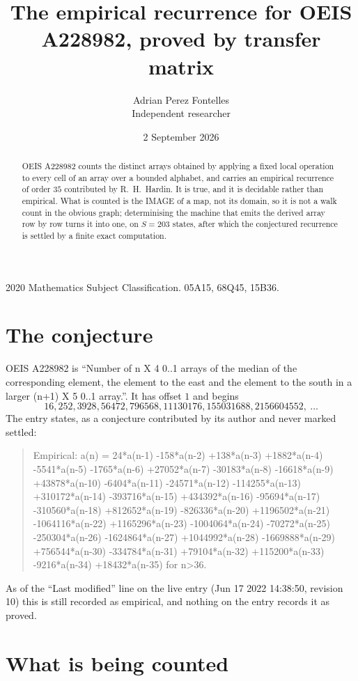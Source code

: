 \documentclass[11pt,a4paper]{article}
\title{The empirical recurrence for OEIS A228982, proved by transfer matrix}
\author{Adrian Perez Fontelles\\ \small Independent researcher}
\date{2 September 2026}
\theoremstyle{plain}
\theoremstyle{definition}
\begin{document}
\maketitle

\begin{abstract}
OEIS A228982 counts the distinct arrays obtained by applying a fixed local operation to every cell
of an array over a bounded alphabet, and carries an empirical recurrence of order $35$
contributed by R.~H.~Hardin. It is true, and it is decidable rather than empirical. What is
counted is the IMAGE of a map, not its domain, so it is not a walk count in the obvious graph;
determinising the machine that emits the derived array row by row turns it into one, on
$S=203$ states, after which the conjectured recurrence is settled by a finite exact
computation.
\end{abstract}

\noindent\small 2020 Mathematics Subject Classification. 05A15, 68Q45, 15B36.\normalsize

\section{The conjecture}

OEIS A228982 is ``Number of n X 4 0..1 arrays of the median of the corresponding element, the element to the east and the element to the south in a larger (n+1) X 5 0..1 array.''. It has offset $1$ and begins
\[
16, 252, 3928, 56472, 796568, 11130176, 155031688, 2156604552,\ \dots
\]
The entry states, as a conjecture contributed by its author and never marked settled:
\begin{quote}
Empirical: a(n) = 24*a(n-1) -158*a(n-2) +138*a(n-3) +1882*a(n-4) -5541*a(n-5) -1765*a(n-6) +27052*a(n-7) -30183*a(n-8) -16618*a(n-9) +43878*a(n-10) -6404*a(n-11) -24571*a(n-12) -114255*a(n-13) +310172*a(n-14) -393716*a(n-15) +434392*a(n-16) -95694*a(n-17) -310560*a(n-18) +812652*a(n-19) -826336*a(n-20) +1196502*a(n-21) -1064116*a(n-22) +1165296*a(n-23) -1004064*a(n-24) -70272*a(n-25) -250304*a(n-26) -1624864*a(n-27) +1044992*a(n-28) -1669888*a(n-29) +756544*a(n-30) -334784*a(n-31) +79104*a(n-32) +115200*a(n-33) -9216*a(n-34) +18432*a(n-35) for n>36.
\end{quote}
As of the ``Last modified'' line on the live entry (Jun 17 2022 14:38:50, revision 10) this is still
recorded as empirical, and nothing on the entry records it as proved.

\section{What is being counted}
\end{document}
